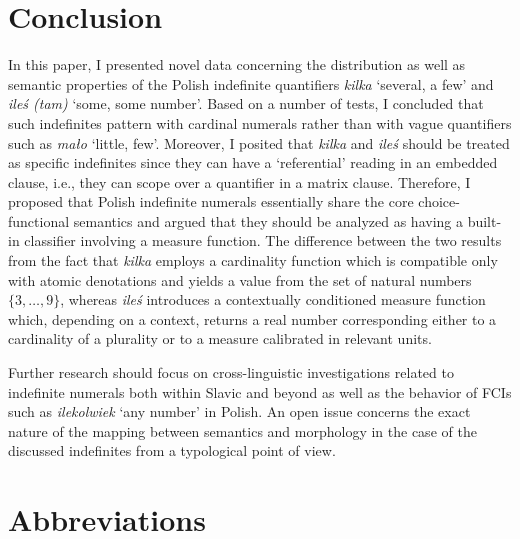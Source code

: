 \documentclass[output=paper,
]{langscibook}
\begin{document}
	\section{Conclusion}\label{sec:conclusion}
	   
	In this paper, I presented novel data concerning the distribution as well as semantic properties of the Polish indefinite quantifiers \textit{kilka} `several, a few' and \textit{ileś (tam)} `some, some number'. Based on a number of tests, I concluded that such indefinites pattern with cardinal numerals rather than with vague quantifiers such as \textit{mało} `little, few'. Moreover, I posited that \textit{kilka} and \textit{ileś} should be treated as specific indefinites since they can have a `referential' reading in an embedded clause, i.e., they can scope over a quantifier in a matrix clause. Therefore, I proposed that Polish indefinite numerals essentially share the core choice-functional semantics and argued that they should be analyzed as having a built-in classifier involving a measure function. The difference between the two results from the fact that \textit{kilka} employs a cardinality function which is compatible only with atomic denotations and yields a value from the set of natural numbers $\{3,\dots,9\}$, whereas \textit{ileś} introduces a contextually conditioned measure function which, depending on a context, returns a real number corresponding either to a cardinality of a plurality or to a measure calibrated in relevant units.
    
	Further research should focus on cross-linguistic investigations related to indefinite numerals both within Slavic and beyond as well as the behavior of FCIs such as \textit{ilekolwiek} `any number' in Polish. An open issue concerns the exact nature of the mapping between semantics and morphology in the case of the discussed indefinites from a typological point of view.
	
	\section*{Abbreviations}
	
\end{document}
